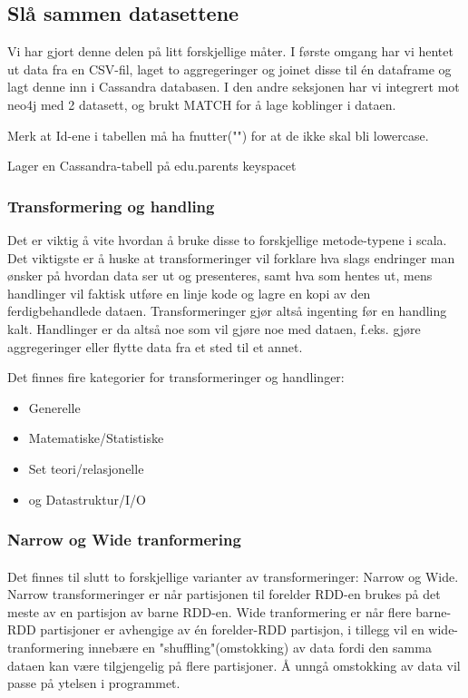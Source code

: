 \subsection{Slå sammen datasettene}
Vi har gjort denne delen på litt forskjellige måter. I første omgang har vi hentet ut data fra en CSV-fil, laget to aggregeringer og joinet disse til én dataframe og lagt denne inn i Cassandra databasen. I den andre seksjonen har vi integrert mot neo4j med 2 datasett, og brukt MATCH for å lage koblinger i dataen.

Merk at Id-ene i tabellen må ha fnutter("") for at de ikke skal bli lowercase.

\large
Lager en Cassandra-tabell på edu.parents keyspacet

\subsubsection{Transformering og handling}
Det er viktig å vite hvordan å bruke disse to forskjellige metode-typene i scala. Det viktigste er å huske at transformeringer vil forklare hva slags endringer man ønsker på hvordan data ser ut og presenteres, samt hva som hentes ut, mens handlinger vil faktisk utføre en linje kode og lagre en kopi av den ferdigbehandlede dataen. Transformeringer gjør altså ingenting før en handling kalt. Handlinger er da altså noe som vil gjøre noe med dataen, f.eks. gjøre aggregeringer eller flytte data fra et sted til et annet.

Det finnes fire kategorier for transformeringer og handlinger:

\begin{itemize}
    \item Generelle
    \item Matematiske/Statistiske
    \item Set teori/relasjonelle
    \item og Datastruktur/I/O
\end{itemize}

\subsubsection{Narrow og Wide tranformering}
\paragraph{}
Det finnes til slutt to forskjellige varianter av transformeringer: Narrow og Wide. Narrow transformeringer er når partisjonen til forelder RDD-en brukes på det meste av en partisjon av barne RDD-en. Wide tranformering er når flere barne-RDD partisjoner er avhengige av én forelder-RDD partisjon, i tillegg vil en wide-tranformering innebære en "shuffling"(omstokking) av data fordi den samma dataen kan være tilgjengelig på flere partisjoner. Å unngå omstokking av data vil passe på ytelsen i programmet.

